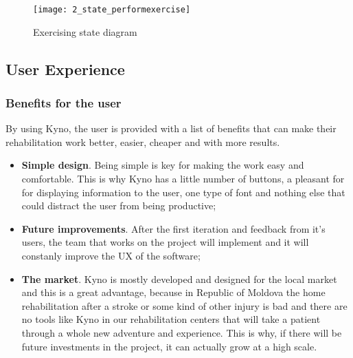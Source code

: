 \begin{figure}[!h]
\centering
\texttt{[image: 2\_state\_performexercise]}
\caption{Exercising state diagram}\label{state_perform}
\end{figure}



\subsection{User Experience}
\subsubsection{Benefits for the user}
By using Kyno, the user is provided with a list of benefits that can make their rehabilitation work better, easier, cheaper and with more results.

\begin{itemize}
\item \textbf{Simple design}. Being simple is key for making the work easy and comfortable. This is why Kyno has a little number of buttons, a pleasant for for displaying information to the user, one type of font and nothing else that could distract the user from being productive;

\item \textbf{Future improvements}. After the first iteration and feedback from it's users, the team that works on the project will implement and it will constanly improve the UX of the software;

\item \textbf{The market}. Kyno is mostly developed and designed for the local market and this is a great advantage, because in Republic of Moldova the home rehabilitation after a stroke or some kind of other injury is bad and there are no tools like Kyno in our rehabilitation centers that will take a patient through a whole new adventure and experience. This is why, if there will be future investments in the project, it can actually grow at a high scale.
\end{itemize}

\clearpage